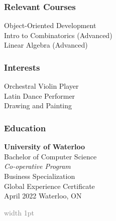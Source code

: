 \documentclass{mxresume}
\begin{document}
\begin{minipage}[t]{0.26\textwidth}
\begin{sidebar}
\subsubsection*{Relevant Courses}
Object-Oriented Development \\[1mm]
Intro to Combinatorics (Advanced) \\[1mm]
Linear Algebra (Advanced)
\subsubsection*{Interests}
Orchestral Violin Player \\[1mm]
Latin Dance Performer \\[1mm]
Drawing and Painting
\subsubsection*{Education}
\textbf{University of Waterloo} \\[1.2mm]
Bachelor of Computer Science \\
\textit{Co-operative Program} \\[1.2mm]
\tab Business Specialization \\
\tab Global Experience Certificate \\[2mm]
April 2022 \GBar Waterloo, ON
\end{sidebar}
\end{minipage}
%
\hfill\textcolor{gray}{\vline width 1pt}\hfill
%
\end{document}
